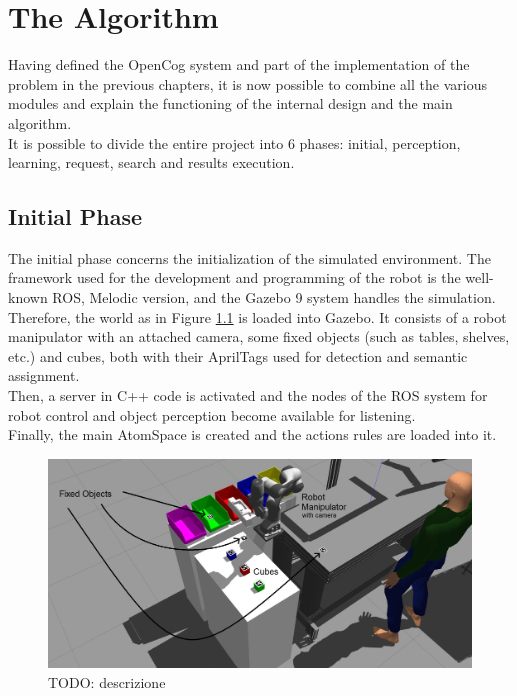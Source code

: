 
\chapter{The Algorithm} \label{cha:algorithm}

Having defined the OpenCog system and part of the implementation of the problem in the previous chapters, it is now possible to combine all the various modules and explain the functioning of the internal design and the main algorithm. \\

It is possible to divide the entire project into 6 phases: initial, perception, learning, request, search and results execution.  

\section{Initial Phase}\label{sec:init}

The initial phase concerns the initialization of the simulated environment. The framework used for the development and programming of the robot is the well-known ROS, Melodic version, and the Gazebo 9 system handles the simulation. \\
Therefore, the world as in Figure \ref{fig:env_2_named} is loaded into Gazebo. 
It consists of a robot manipulator with an attached camera, some fixed objects (such as tables, shelves, etc.) and cubes, both with their AprilTags used for detection and semantic assignment. \\
Then, a server in C++ code is activated and the nodes of the ROS system for robot control and object perception become available for listening. \\
Finally, the main AtomSpace is created and the actions rules are loaded into it. 

\begin{figure} [h]
\centering
\includegraphics[width=0.9
\textwidth]{figures/Magistrale/env_2_named}
\caption[Environment Components]{ TODO: descrizione
\label{fig:env_2_named}}
\end{figure} 

